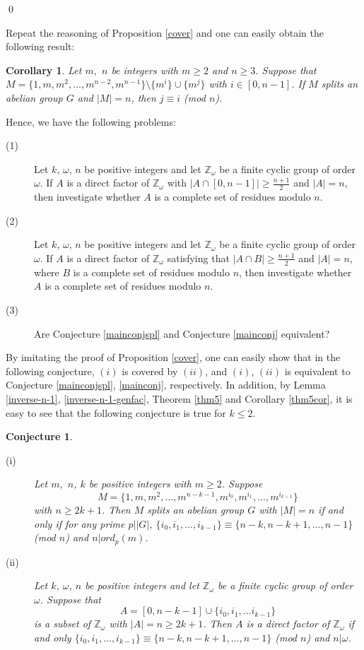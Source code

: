 \documentclass[preprint]{elsarticle}
\newtheorem{cor}[thm]{Corollary}
\newtheorem{conj}[thm]{Conjecture}
\begin{document}
\qed

Repeat the reasoning of Proposition \ref{cover} and one can easily obtain the following result:

\begin{cor} \label{inverse-n-1-gen}
Let $m,$ $n$ be integers with $m\geq 2$ and $n\geq 3$.
Suppose that $M=\{1,m,m^2,\ldots ,m^{n-2},m^{n-1}\}\setminus \{m^i\}\cup \{m^j\}$ with $i\in [0,n-1]$.
If $M$ splits an abelian group $G$ and $|M|=n$, then $j\equiv i$ (mod $n$).
\end{cor}


Hence, we have the following problems:

\begin{description}
  \item[(1)] Let $k$, $\omega$, $n$ be positive integers and let $\mathbb{Z}_{\omega}$ be a finite cyclic group of order $\omega$.
If $A$ is a direct factor of $\mathbb{Z}_{\omega}$ with $|A\cap[0,n-1]|\geq\frac{n+1}{2}$ and $|A|=n$, then  investigate whether $A$ is a complete set of residues modulo $n$.
  \item[(2)] Let $k$, $\omega$, $n$ be positive integers and let $\mathbb{Z}_{\omega}$ be a finite cyclic group of order $\omega$.
If $A$ is a direct factor of $\mathbb{Z}_{\omega}$ satisfying that $|A\cap B|\geq\frac{n+1}{2}$ and $|A|=n$,
where $B$ is a complete set of residues modulo $n$, then investigate whether $A$ is a complete set of residues modulo $n$.
  \item[(3)] Are Conjecture \ref{mainconjspl} and Conjecture \ref{mainconj} equivalent?
\end{description}

\rmk
By imitating the proof of Proposition \ref{cover},
one can easily show that in the following conjecture,
$(i)$ is covered by $(ii)$, and $(i)$, $(ii)$ is equivalent to Conjecture \ref{mainconjspl}, \ref{mainconj}, respectively.
In addition, by Lemma \ref{inverse-n-1}, \ref{inverse-n-1-genfac}, Theorem \ref{thm5} and Corollary \ref{thm5cor},
it is easy to see that the following conjecture is true for $k\leq 2$.

\begin{conj} \label{equal-conj}

\begin{description}
  \item[(i)] Let $m,$ $n$, $k$ be positive integers with $m\geq 2$.
Suppose $$M=\{1,m,m^2,\ldots ,m^{n-k-1},m^{i_0},m^{i_1},\ldots ,m^{i_{k-1}}\}$$ with $n\geq 2k+1$.
Then $M$ splits an abelian group $G$ with $|M|=n$ if and only if for any prime $p||G|$, $\{i_0,i_1,\ldots ,i_{k-1}\}\equiv \{n-k,n-k+1,\ldots ,n-1\}$ (mod $n$) and $n|ord_p(m)$.
  \item[(ii)] Let $k$, $\omega$, $n$ be positive integers and let $\mathbb{Z}_{\omega}$ be a finite cyclic group of order $\omega$.
Suppose that $$A=[0,n-k-1]\cup\{i_0,i_1,\ldots i_{k-1}\}$$
is a subset of $\mathbb{Z}_{\omega}$ with $|A|=n\geq 2k+1$.
Then $A$ is a direct factor of $\mathbb{Z}_{\omega}$ if and only $\{i_0,i_1,\ldots ,i_{k-1}\}\equiv \{n-k,n-k+1,\ldots ,n-1\}$ (mod $n$) and $n|\omega$.
\end{description}

\end{conj}
\end{document}
